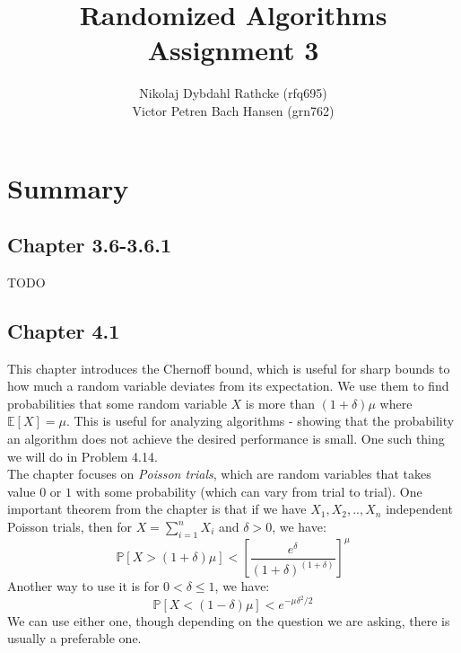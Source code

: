 \documentclass[a4paper]{article}
\author{Nikolaj Dybdahl Rathcke (rfq695) \\ Victor Petren Bach Hansen (grn762)}
\title{Randomized Algorithms \\ Assignment 3}
\begin{document}
\maketitle

\section*{Summary}
\subsection*{Chapter 3.6-3.6.1}
TODO

\subsection*{Chapter 4.1}
This chapter introduces the Chernoff bound, which is useful for sharp bounds to how much a random variable deviates from its expectation. We use them to find probabilities that some random variable $X$ is more than $(1+\delta)\mu$ where $\mathbb{E}[X]=\mu$. This is useful for analyzing algorithms - showing that the probability an algorithm does not achieve the desired performance is small. One such thing we will do in Problem 4.14. \\
The chapter focuses on \textit{Poisson trials}, which are random variables that takes value $0$ or $1$ with some probability (which can vary from trial to trial). One important theorem from the chapter is that if we have $X_1,X_2,..,X_n$ independent Poisson trials, then for $X=\sum_{i=1}^n X_i$ and $\delta >0$, we have:
$$
\mathbb{P}[X > (1+\delta)\mu] < \left[ \frac{e^\delta}{(1+\delta)^{(1+\delta)}}\right]^\mu
$$
Another way to use it is for $0<\delta\leq1$, we have:
$$
\mathbb{P}[X < (1-\delta)\mu]<e^{-\mu\delta^2/2}
$$
We can use either one, though depending on the question we are asking, there is usually a preferable one.
\end{document}
